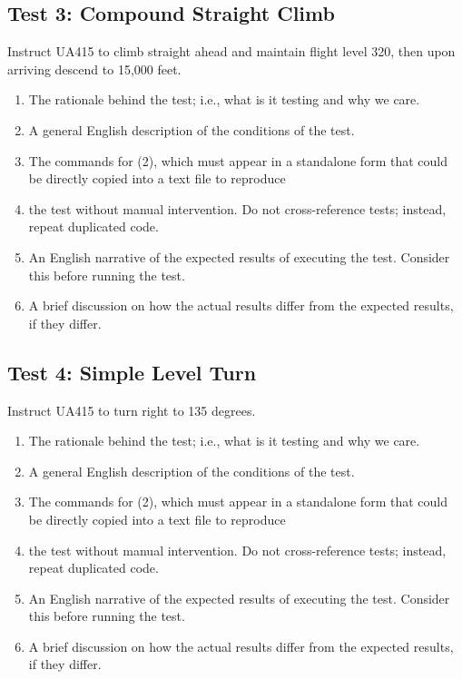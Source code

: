 \documentclass[letterpaper, 12pt]{article}
\begin{document}
\subsection{Test 3: Compound Straight Climb}
Instruct UA415 to climb straight ahead and maintain flight level 320, then upon arriving descend to 15,000 feet.
\begin{enumerate}
\item The rationale behind the test; i.e., what is it testing and why we care.
\item A general English description of the conditions of the test.
\item The commands for (2), which must appear in a standalone form that could be directly copied into a text file to reproduce
\item the test without manual intervention. Do not cross-reference tests; instead, repeat duplicated code.
\item An English narrative of the expected results of executing the test. Consider this before running the test.
\item A brief discussion on how the actual results differ from the expected results, if they differ.
\end{enumerate}

\subsection{Test 4: Simple Level Turn}
Instruct UA415 to turn right to 135 degrees.
\begin{enumerate}
\item The rationale behind the test; i.e., what is it testing and why we care.
\item A general English description of the conditions of the test.
\item The commands for (2), which must appear in a standalone form that could be directly copied into a text file to reproduce
\item the test without manual intervention. Do not cross-reference tests; instead, repeat duplicated code.
\item An English narrative of the expected results of executing the test. Consider this before running the test.
\item A brief discussion on how the actual results differ from the expected results, if they differ.
\end{enumerate}
\end{document}
